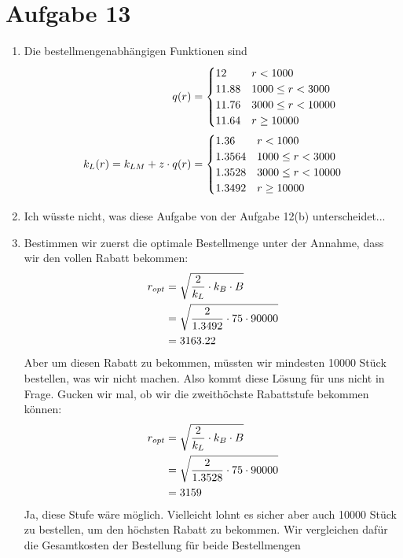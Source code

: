 \documentclass{article}
\begin{document}
	\section*{Aufgabe 13}
	\begin{enumerate}[label=(\alph*)]
		\item Die bestellmengenabhängigen Funktionen sind
		\begin{align}
			q(r) &= \begin{cases}
				12 & r < 1000 \\
				11.88 & 1000 \le r < 3000 \\
				11.76 & 3000 \le r < 10000 \\
				11.64 & r\ge 10000
			\end{cases} \notag \\
			k_L(r) = k_{LM} + z\cdot q(r) &= \begin{cases}
				1.36 & r < 1000 \\
				1.3564 & 1000 \le r < 3000 \\
				1.3528 & 3000 \le r < 10000 \\
				1.3492 & r \ge 10000
			\end{cases} \notag
		\end{align}
		\item Ich wüsste nicht, was diese Aufgabe von der Aufgabe 12(b) unterscheidet...
		\item Bestimmen wir zuerst die optimale Bestellmenge unter der Annahme, dass wir den vollen Rabatt bekommen:
		\begin{align}
			r_{opt} &= \sqrt{\frac{2}{k_L}\cdot k_B \cdot B} \notag \\
			&= \sqrt{\frac{2}{1.3492}\cdot 75 \cdot 90000} \notag \\
			&= 3163.22 \notag
		\end{align}
		Aber um diesen Rabatt zu bekommen, müssten wir mindesten 10000 Stück bestellen, was wir nicht machen. Also kommt diese Lösung für uns nicht in Frage. Gucken wir mal, ob wir die zweithöchste Rabattstufe bekommen können:
		\begin{align}
			r_{opt} &= \sqrt{\frac{2}{k_L}\cdot k_B \cdot B} \notag \\
			&= \sqrt{\frac{2}{1.3528}\cdot 75 \cdot 90000} \notag \\
			&= 3159 \notag
		\end{align}
		Ja, diese Stufe wäre möglich. Vielleicht lohnt es sicher aber auch 10000 Stück zu bestellen, um den höchsten Rabatt zu bekommen. Wir vergleichen dafür die Gesamtkosten der Bestellung für beide Bestellmengen

\end{enumerate}
\end{document}
